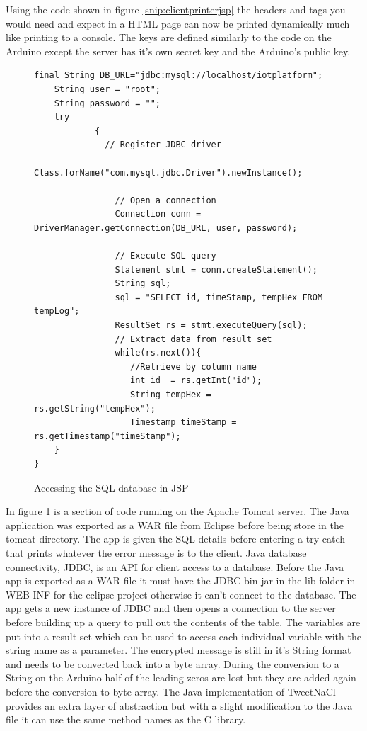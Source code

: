 Using the code shown in figure \ref{snip:clientprinterjsp} the headers and tags you would need and expect in a HTML page can now be printed dynamically much like printing to a console. The keys are defined similarly to the code on the Arduino except the server has it's own secret key and the Arduino's public key.

\begin{figure}[H]
\begin{lstlisting}[style=Java]
	final String DB_URL="jdbc:mysql://localhost/iotplatform";
	String user = "root"; 
	String password = "";
	try
	        {
	          // Register JDBC driver
	          Class.forName("com.mysql.jdbc.Driver").newInstance();

	            // Open a connection
	            Connection conn = DriverManager.getConnection(DB_URL, user, password);

	            // Execute SQL query
	            Statement stmt = conn.createStatement();
	            String sql;
	            sql = "SELECT id, timeStamp, tempHex FROM tempLog";
	            ResultSet rs = stmt.executeQuery(sql);
	            // Extract data from result set
	            while(rs.next()){
	               //Retrieve by column name
	               int id  = rs.getInt("id");
	               String tempHex = rs.getString("tempHex");
	               Timestamp timeStamp = rs.getTimestamp("timeStamp");
	}
}
\end{lstlisting}
\caption{Accessing the SQL database in JSP}
\label{snip:jspcode}
\end{figure}

In figure \ref{snip:jspcode} is a section of code running on the Apache Tomcat server. The Java application was exported as a WAR file from Eclipse before being store in the tomcat directory. The app is given the SQL details before entering a try catch that prints whatever the error message is to the client. Java database connectivity, JDBC, is an API for client access to a database. Before the Java app is exported as a WAR file it must have the JDBC bin jar in the lib folder in WEB-INF for the eclipse project otherwise it can't connect to the database\cite{jdbc}. The app gets a new instance of JDBC and then opens a connection to the server before building up a query to pull out the contents of the table. The variables are put into a result set which can be used to access each individual variable with the string name as a parameter. The encrypted message is still in it's String format and needs to be converted back into a byte array. During the conversion to a String on the Arduino half of the leading zeros are lost but they are added again before the conversion to byte array. The Java implementation of TweetNaCl provides an extra layer of abstraction but with a slight modification to the Java file it can use the same method names as the C library.

